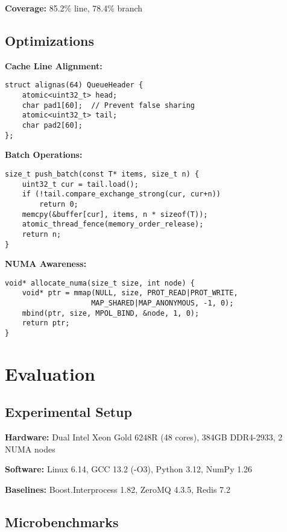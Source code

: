 \documentclass[sigconf,anonymous]{acmart}
\begin{document}
\textbf{Coverage:} 85.2\% line, 78.4\% branch

\subsection{Optimizations}

\textbf{Cache Line Alignment:}
\begin{lstlisting}
struct alignas(64) QueueHeader {
    atomic<uint32_t> head;
    char pad1[60];  // Prevent false sharing
    atomic<uint32_t> tail;
    char pad2[60];
};
\end{lstlisting}

\textbf{Batch Operations:}
\begin{lstlisting}
size_t push_batch(const T* items, size_t n) {
    uint32_t cur = tail.load();
    if (!tail.compare_exchange_strong(cur, cur+n))
        return 0;
    memcpy(&buffer[cur], items, n * sizeof(T));
    atomic_thread_fence(memory_order_release);
    return n;
}
\end{lstlisting}

\textbf{NUMA Awareness:}
\begin{lstlisting}
void* allocate_numa(size_t size, int node) {
    void* ptr = mmap(NULL, size, PROT_READ|PROT_WRITE,
                    MAP_SHARED|MAP_ANONYMOUS, -1, 0);
    mbind(ptr, size, MPOL_BIND, &node, 1, 0);
    return ptr;
}
\end{lstlisting}

\section{Evaluation}

\subsection{Experimental Setup}

\textbf{Hardware:} Dual Intel Xeon Gold 6248R (48 cores), 384GB DDR4-2933, 2 NUMA nodes

\textbf{Software:} Linux 6.14, GCC 13.2 (-O3), Python 3.12, NumPy 1.26

\textbf{Baselines:} Boost.Interprocess 1.82, ZeroMQ 4.3.5, Redis 7.2

\subsection{Microbenchmarks}
\end{document}
